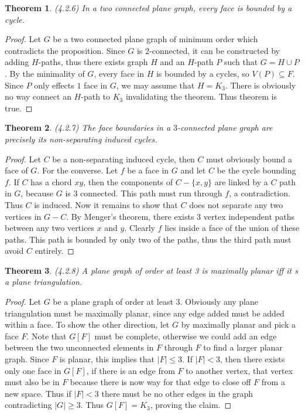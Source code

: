 \documentclass[12pt]{article}
\newtheorem{theorem}{Theorem}
\begin{document}
\begin{theorem} (4.2.6) In a two connected plane graph, every face is
  bounded by a cycle.
\end{theorem}
\begin{proof} Let $G$ be a two connected plane graph of minimum order
  which contradicts the proposition. Since $G$ is 2-connected, it can
  be constructed by adding $H$-paths, thus there exists graph $H$ and
  an $H$-path $P$ such that $G = H \cup P$. By the minimality of $G$,
  every face in $H$ is bounded by a cycles, so $V(P) \subseteq
  F$. Since $P$ only effects $1$ face in $G$, we may assume that
  $H = K_3$. There is obviously no way connect an $H$-path to $K_3$
  invalidating the theorem. Thus theorem is true.
\end{proof}


\begin{theorem} (4.2.7) The face boundaries in a $3$-connected plane
  graph are precisely its non-separating induced cycles.
\end{theorem}
\begin{proof} Let $C$ be a non-separating induced cycle, then $C$ must
  obviously bound a face of $G$. For the converse. Let $f$ be a face
  in $G$ and let $C$ be the cycle bounding $f$. If $C$ has a chord
  $xy$, then the components of $C-\{x, y\}$ are linked by a $C$ path
  in $G$, because $G$ is $3$ connected. This path must run through
  $f$, a contradiction. Thus $C$ is induced. Now it remains to show
  that $C$ does not separate any two vertices in $G - C$. By Menger's
  theorem, there exists $3$ vertex independent paths between any two
  vertices $x$ and $y$. Clearly $f$ lies inside a face of the union of
  these paths. This path is bounded by only two of the paths, thus the
  third path must avoid $C$ entirely.
\end{proof}

\begin{theorem} (4.2.8) A plane graph of order at least 3 is maximally
  planar iff it s a plane triangulation.
\end{theorem}
\begin{proof} Let $G$ be a plane graph of order at least 3. Obviously
  any plane triangulation must be maximally planar, since any edge
  added must be added within a face. To show the other direction, let
  $G$ by maximally planar and pick a face $F$. Note that $G[F]$ must
  be complete, otherwise we could add an edge between the two
  unconnected elements in $F$ through $F$ to find a larger planar
  graph. Since $F$ is planar, this implies that $|F| \leq 3$. If
  $|F| < 3$, then there exists only one face in $G[F]$, if there is an
  edge from $F$ to another vertex, that vertex must also be in $F$
  because there is now way for that edge to close off $F$ from a new
  space. Thus if $|F| < 3$ there must be no other edges in the graph
  contradicting $|G| \geq 3$. Thus $G[F] = K_3$, proving the claim.
\end{proof}
\end{document}
